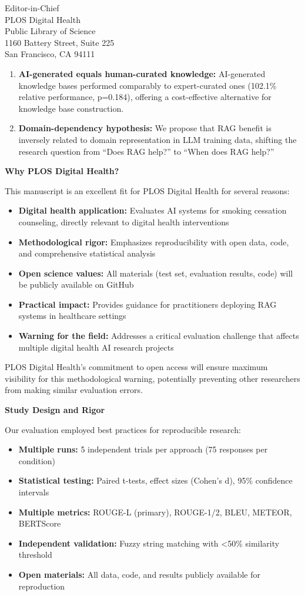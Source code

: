\documentclass[11pt]{letter}
\begin{document}
\begin{letter}{%
Editor-in-Chief\\
PLOS Digital Health\\
Public Library of Science\\
1160 Battery Street, Suite 225\\
San Francisco, CA 94111}
\begin{enumerate}
    \item \textbf{AI-generated equals human-curated knowledge:} AI-generated knowledge bases performed comparably to expert-curated ones (102.1\% relative performance, p=0.184), offering a cost-effective alternative for knowledge base construction.

    \item \textbf{Domain-dependency hypothesis:} We propose that RAG benefit is inversely related to domain representation in LLM training data, shifting the research question from ``Does RAG help?'' to ``When does RAG help?''
\end{enumerate}

\textbf{Why PLOS Digital Health?}

This manuscript is an excellent fit for PLOS Digital Health for several reasons:

\begin{itemize}
    \item \textbf{Digital health application:} Evaluates AI systems for smoking cessation counseling, directly relevant to digital health interventions
    \item \textbf{Methodological rigor:} Emphasizes reproducibility with open data, code, and comprehensive statistical analysis
    \item \textbf{Open science values:} All materials (test set, evaluation results, code) will be publicly available on GitHub
    \item \textbf{Practical impact:} Provides guidance for practitioners deploying RAG systems in healthcare settings
    \item \textbf{Warning for the field:} Addresses a critical evaluation challenge that affects multiple digital health AI research projects
\end{itemize}

PLOS Digital Health's commitment to open access will ensure maximum visibility for this methodological warning, potentially preventing other researchers from making similar evaluation errors.

\textbf{Study Design and Rigor}

Our evaluation employed best practices for reproducible research:
\begin{itemize}
    \item \textbf{Multiple runs:} 5 independent trials per approach (75 responses per condition)
    \item \textbf{Statistical testing:} Paired t-tests, effect sizes (Cohen's d), 95\% confidence intervals
    \item \textbf{Multiple metrics:} ROUGE-L (primary), ROUGE-1/2, BLEU, METEOR, BERTScore
    \item \textbf{Independent validation:} Fuzzy string matching with <50\% similarity threshold
    \item \textbf{Open materials:} All data, code, and results publicly available for reproduction
\end{itemize}


\end{letter}
\end{document}
